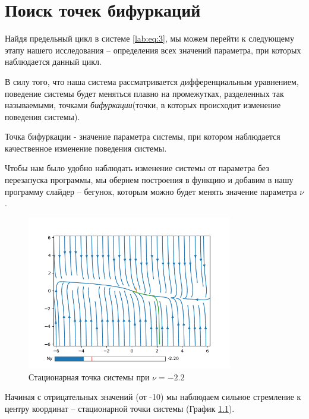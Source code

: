 \chapter{Поиск точек бифуркаций}

Найдя предельный цикл в системе \eqref{lab:eq:3}, мы можем перейти к следующему
этапу нашего исследования -- определения всех значений параметра, при которых
наблюдается данный цикл.

В силу того, что наша система рассматривается дифференциальным уравнением,
поведение системы будет меняться плавно на промежутках, разделенных так
называемыми, точками \textit{бифуркации}(точки, в которых происходит изменение
поведения системы).

\begin{definition}
    Точка бифуркации - значение параметра системы, при котором наблюдается
    качественное изменение поведения системы.
\end{definition}

Чтобы нам было удобно наблюдать изменение системы от параметра без перезапуска
программы, мы обернем построения в функцию и добавим в нашу программу слайдер --
бегунок, которым можно будет менять значение параметра $\nu$.

\begin{figure}
    \centering
    \includegraphics[width=0.8\textwidth]{figures/2_point_-2_2}
    \caption{Стационарная точка системы при $\nu = -2.2$}
    \label{lab2:point_-2}
\end{figure}

Начиная с отрицательных значений (от -10) мы наблюдаем сильное стремление
к центру координат -- стационарной точки системы (График \ref{lab2:point_-2}).

